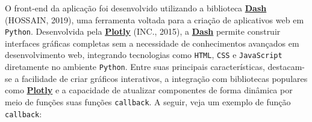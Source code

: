 \documentclass[
  12pt,
  a4paper,
]{scrreprt}
\begin{document}
O front-end da aplicação foi desenvolvido utilizando a biblioteca
\href{https://dash.plotly.com/}{\textbf{Dash}} (HOSSAIN, 2019), uma
ferramenta voltada para a criação de aplicativos web em \texttt{Python}.
Desenvolvida pela \href{https://plotly.com/}{\textbf{Plotly}} (INC.,
2015), a \href{https://dash.plotly.com/}{\textbf{Dash}} permite
construir interfaces gráficas completas sem a necessidade de
conhecimentos avançados em desenvolvimento web, integrando tecnologias
como \texttt{HTML}, \texttt{CSS} e \texttt{JavaScript} diretamente no
ambiente \texttt{Python}. Entre suas principais características,
destacam-se a facilidade de criar gráficos interativos, a integração com
bibliotecas populares como \href{https://plotly.com/}{\textbf{Plotly}} e
a capacidade de atualizar componentes de forma dinâmica por meio de
funções suas funções \texttt{callback}. A seguir, veja um exemplo de
função \texttt{callback}:
\end{document}
